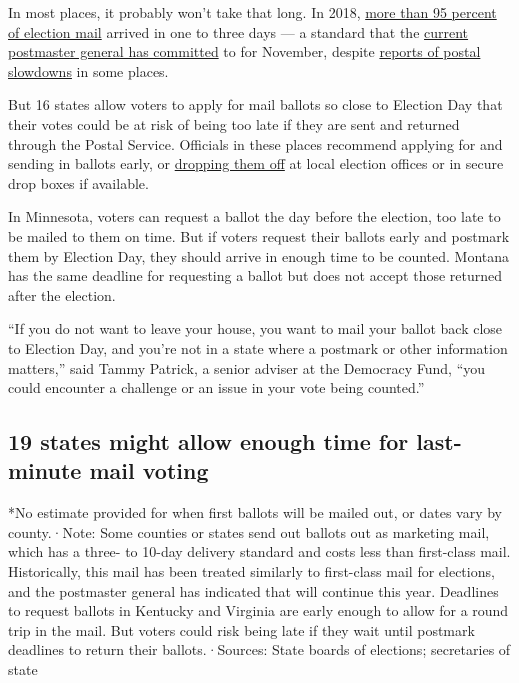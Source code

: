 In most places, it probably won't take that long. In 2018,
\href{https://www.uspsoig.gov/sites/default/files/document-library-files/2019/19XG010NO000.pdf}{more
than 95 percent of election mail} arrived in one to three days --- a
standard that the
\href{https://www.nytimes3xbfgragh.onion/reuters/2020/08/21/us/politics/21reuters-usa-election-post-office-senate.html}{current
postmaster general has committed} to for November, despite
\href{https://www.nytimes3xbfgragh.onion/2020/08/15/us/post-office-vote-by-mail.html?action=click\&module=RelatedLinks\&pgtype=Article}{reports
of postal slowdowns} in some places.

But 16 states allow voters to apply for mail ballots so close to
Election Day that their votes could be at risk of being too late if they
are sent and returned through the Postal Service. Officials in these
places recommend applying for and sending in ballots early, or
\href{https://www.nytimes3xbfgragh.onion/2020/08/17/us/politics/postal-service-voting.html}{dropping
them off} at local election offices or in secure drop boxes if
available.

In Minnesota, voters can request a ballot the day before the election,
too late to be mailed to them on time. But if voters request their
ballots early and postmark them by Election Day, they should arrive in
enough time to be counted. Montana has the same deadline for requesting
a ballot but does not accept those returned after the election.

``If you do not want to leave your house, you want to mail your ballot
back close to Election Day, and you're not in a state where a postmark
or other information matters,'' said Tammy Patrick, a senior adviser at
the Democracy Fund, ``you could encounter a challenge or an issue in
your vote being counted.''

\hypertarget{19-states-might-allow-enough-time-for-last-minute-mail-voting}{%
\subsection{\texorpdfstring{19 states \textbf{might allow enough time}
for last-minute mail
voting}{19 states might allow enough time for last-minute mail voting}}\label{19-states-might-allow-enough-time-for-last-minute-mail-voting}}

*No estimate provided for when first ballots will be mailed out, or
dates vary by county.·Note: Some counties or states send out ballots out
as marketing mail, which has a three- to 10-day delivery standard and
costs less than first-class mail. Historically, this mail has been
treated similarly to first-class mail for elections, and the postmaster
general has indicated that will continue this year. Deadlines to request
ballots in Kentucky and Virginia are early enough to allow for a round
trip in the mail. But voters could risk being late if they wait until
postmark deadlines to return their ballots.·Sources: State boards of
elections; secretaries of state

